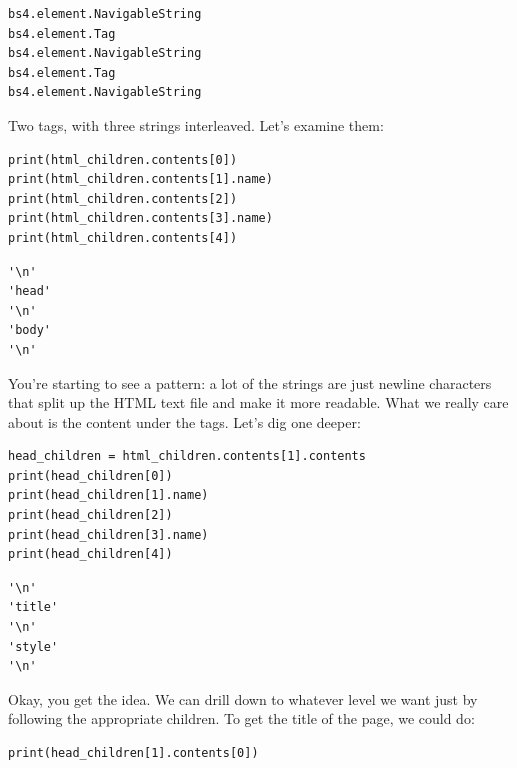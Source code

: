 \begin{Verbatim}[fontsize=\small,samepage=true,frame=leftline,framesep=5mm,framerule=1mm]
bs4.element.NavigableString
bs4.element.Tag
bs4.element.NavigableString
bs4.element.Tag
bs4.element.NavigableString
\end{Verbatim}

Two tags, with three strings interleaved. Let's examine them:

\begin{Verbatim}[fontsize=\small,samepage=true,frame=single,framesep=3mm]
print(html_children.contents[0])
print(html_children.contents[1].name)
print(html_children.contents[2])
print(html_children.contents[3].name)
print(html_children.contents[4])
\end{Verbatim}
\vspace{-.2in}

\begin{Verbatim}[fontsize=\small,samepage=true,frame=leftline,framesep=5mm,framerule=1mm]
'\n'
'head'
'\n'
'body'
'\n'
\end{Verbatim}

You're starting to see a pattern: a lot of the strings are just newline
characters that split up the HTML text file and make it more readable. What we
really care about is the content under the tags. Let's dig one deeper:

\begin{Verbatim}[fontsize=\small,samepage=true,frame=single,framesep=3mm]
head_children = html_children.contents[1].contents
print(head_children[0])
print(head_children[1].name)
print(head_children[2])
print(head_children[3].name)
print(head_children[4])
\end{Verbatim}
\vspace{-.2in}

\begin{Verbatim}[fontsize=\small,samepage=true,frame=leftline,framesep=5mm,framerule=1mm]
'\n'
'title'
'\n'
'style'
'\n'
\end{Verbatim}

Okay, you get the idea. We can drill down to whatever level we want just by
following the appropriate children. To get the title of the page, we could do:


\begin{Verbatim}[fontsize=\small,samepage=true,frame=single,framesep=3mm]
print(head_children[1].contents[0])
\end{Verbatim}
\vspace{-.2in}

